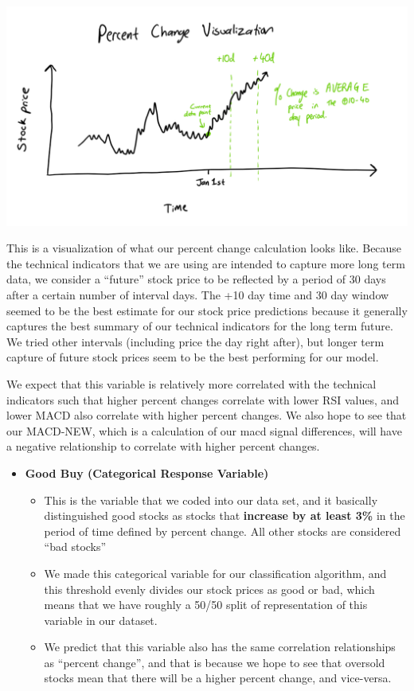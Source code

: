 \documentclass[
]{article}
\begin{document}
\includegraphics{images/explanation.png}

This is a visualization of what our percent change calculation looks
like. Because the technical indicators that we are using are intended to
capture more long term data, we consider a ``future'' stock price to be
reflected by a period of 30 days after a certain number of interval
days. The +10 day time and 30 day window seemed to be the best estimate
for our stock price predictions because it generally captures the best
summary of our technical indicators for the long term future. We tried
other intervals (including price the day right after), but longer term
capture of future stock prices seem to be the best performing for our
model.

We expect that this variable is relatively more correlated with the
technical indicators such that higher percent changes correlate with
lower RSI values, and lower MACD also correlate with higher percent
changes. We also hope to see that our MACD-NEW, which is a calculation
of our macd signal differences, will have a negative relationship to
correlate with higher percent changes.

\begin{itemize}
\item
  \textbf{Good Buy (Categorical Response Variable)}

  \begin{itemize}
  \item
    This is the variable that we coded into our data set, and it
    basically distinguished good stocks as stocks that \textbf{increase
    by at least 3\%} in the period of time defined by percent change.
    All other stocks are considered ``bad stocks''
  \item
    We made this categorical variable for our classification algorithm,
    and this threshold evenly divides our stock prices as good or bad,
    which means that we have roughly a 50/50 split of representation of
    this variable in our dataset.
  \item
    We predict that this variable also has the same correlation
    relationships as ``percent change'', and that is because we hope to
    see that oversold stocks mean that there will be a higher percent
    change, and vice-versa.
  \end{itemize}
\end{itemize}
\end{document}
